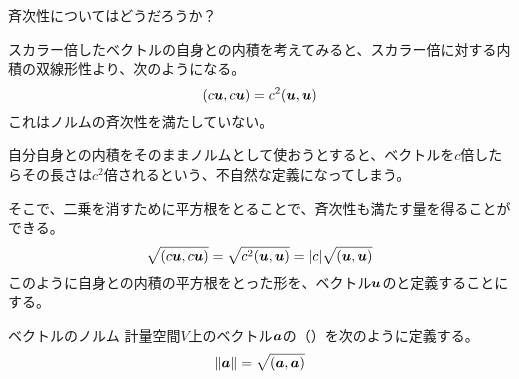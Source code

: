 \documentclass[../../../topic_linear-algebra]{subfiles}
\begin{document}
\br

斉次性についてはどうだろうか？

スカラー倍したベクトルの自身との内積を考えてみると、スカラー倍に対する内積の双線形性より、次のようになる。
\begin{equation*}
  (c\vb*{u}, c\vb*{u}) = c^2(\vb*{u}, \vb*{u})
\end{equation*}
これはノルムの斉次性を満たしていない。

\br

自分自身との内積をそのままノルムとして使おうとすると、ベクトルを$c$倍したらその長さは$c^2$倍されるという、不自然な定義になってしまう。

\br

そこで、二乗を消すために平方根をとることで、斉次性も満たす量を得ることができる。
\begin{equation*}
  \sqrt{(c\vb*{u}, c\vb*{u})} = \sqrt{c^2(\vb*{u}, \vb*{u})} = |c|\sqrt{(\vb*{u}, \vb*{u})}
\end{equation*}
このように自身との内積の平方根をとった形を、ベクトル$\vb*{u}$のと定義することにする。

\begin{definition}{ベクトルのノルム}
  計量空間$V$上のベクトル$\vb*{a}$の（）を次のように定義する。
  \begin{align*}
    \|\vb*{a}\| = \sqrt{(\vb*{a}, \vb*{a})}
  \end{align*}
\end{definition}
\end{document}
